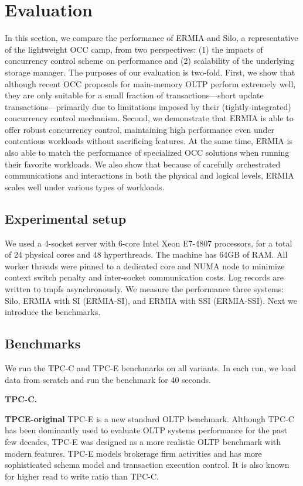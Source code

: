 
\section{Evaluation}
In this section, we compare the performance of ERMIA and Silo, a representative of the lightweight OCC camp, from two perspectives: (1) the impacts of concurrency control scheme on performance and (2) scalability of the underlying storage manager. The purposes of our evaluation is two-fold. First, we show that although recent OCC proposals for main-memory OLTP perform extremely well, they are only suitable for a small fraction of transactions---short update transactions---primarily due to limitations imposed by their (tightly-integrated) concurrency control mechanism. Second, we demonstrate that ERMIA is able to offer robust concurrency control, maintaining high performance even under contentious workloads without sacrificing features. At the same time, ERMIA is also able to match the performance of specialized OCC solutions when running their favorite workloads. We also show that because of carefully orchestrated communications and interactions in both the physical and logical levels, ERMIA scales well under various types of workloads.

\subsection{Experimental setup}
We used a 4-socket server with 6-core Intel Xeon E7-4807 processors, for a total of 24 physical cores and 48 hyperthreads. The machine has 64GB of RAM. All worker threads were pinned to a dedicated core and NUMA node to minimize context switch penalty and inter-socket communication costs. Log records are written to tmpfs asynchronously. We measure the performance three systems: Silo, ERMIA with SI (ERMIA-SI), and ERMIA with SSI (ERMIA-SSI). Next we introduce the benchmarks.

\subsection{Benchmarks}
We run the TPC-C and TPC-E benchmarks on all variants. In each run, we load data from scratch and run the benchmark for 40 seconds.

\textbf{TPC-C.}

\textbf{TPCE-original}
TPC-E is a new standard OLTP benchmark. Although TPC-C has been dominantly used to evaluate OLTP systems performance for the past few decades, TPC-E was designed as a more realistic OLTP benchmark with modern features.  TPC-E models brokerage firm activities and has more sophisticated schema model and transaction execution control. It is also known for higher read to write ratio than TPC-C.


